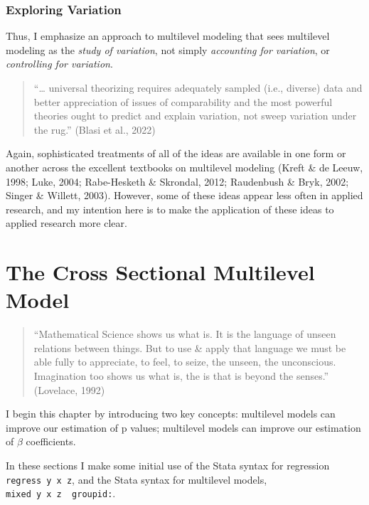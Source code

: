 \documentclass[
  letterpaper,
  DIV=11,
  numbers=noendperiod]{scrreprt}
\begin{document}
\subsection{Exploring Variation}\label{exploring-variation}

Thus, I emphasize an approach to multilevel modeling that sees
multilevel modeling as the \emph{study of variation}, not simply
\emph{accounting for variation}, or \emph{controlling for variation}.

\begin{quote}
``\ldots{} universal theorizing requires adequately sampled (i.e.,
diverse) data and better appreciation of issues of comparability and the
most powerful theories ought to predict and explain variation, not sweep
variation under the rug.'' (Blasi et al., 2022)
\end{quote}

Again, sophisticated treatments of all of the ideas are available in one
form or another across the excellent textbooks on multilevel modeling
(Kreft \& de Leeuw, 1998; Luke, 2004; Rabe-Hesketh \& Skrondal, 2012;
Raudenbush \& Bryk, 2002; Singer \& Willett, 2003). However, some of
these ideas appear less often in applied research, and my intention here
is to make the application of these ideas to applied research more
clear.


\chapter{The Cross Sectional Multilevel
Model}\label{the-cross-sectional-multilevel-model}

\begin{quote}
``Mathematical Science shows us what is. It is the language of unseen
relations between things. But to use \& apply that language we must be
able fully to appreciate, to feel, to seize, the unseen, the
unconscious. Imagination too shows us what is, the is that is beyond the
senses.'' (Lovelace, 1992)
\end{quote}

I begin this chapter by introducing two key concepts: multilevel models
can improve our estimation of p values; multilevel models can improve
our estimation of \(\beta\) coefficients.

In these sections I make some initial use of the Stata syntax for
regression \texttt{regress\ y\ x\ z}, and the Stata syntax for
multilevel models,
\texttt{mixed\ y\ x\ z\ \textbar{}\textbar{}\ groupid:}.
\end{document}
